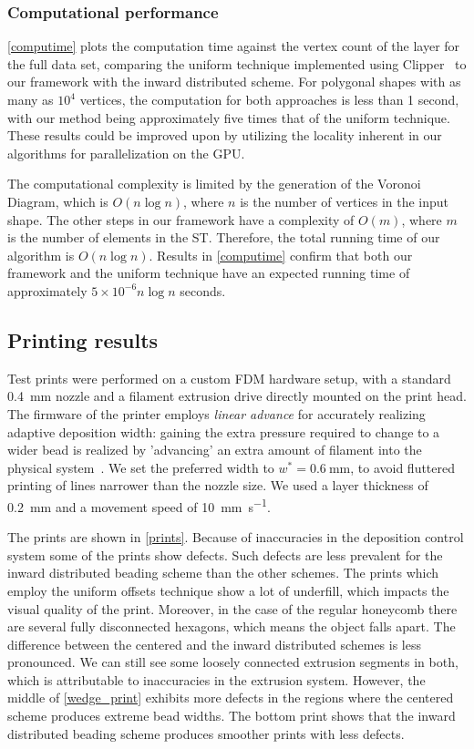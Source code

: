 \subsubsection{Computational performance}
\cref{computime} plots the computation time against the vertex count of the layer for the full data set, comparing the uniform technique implemented using Clipper~\cite{johnson2014clipper} to our framework with the inward distributed scheme.
For polygonal shapes with as many as $10^4$ vertices, the computation for both approaches is less than 1 second, with our method being approximately five times that of the uniform technique.
These results could be improved upon by utilizing the locality inherent in our algorithms for parallelization on the GPU.

The computational complexity is limited by the generation of the Voronoi Diagram, which is $O(n \log n)$, where $n$ is the number of vertices in the input shape.
The other steps in our framework have a complexity of $O(m)$, where $m$ is the number of elements in the ST.
Therefore, the total running time of our algorithm is $O(n \log n)$.
Results in \cref{computime} confirm that both our framework and the uniform technique have an expected running time of approximately $5 \times 10^{-6} n \log n$ seconds.






\subsection{Printing results}
Test prints were performed on a custom FDM hardware setup, with a standard \SI{0.4}{\milli\meter} nozzle and a filament extrusion drive directly mounted on the print head.
The firmware of the printer employs \emph{linear advance} for accurately realizing adaptive deposition width:
gaining the extra pressure required to change to a wider bead is realized by 'advancing' an extra amount of filament into the physical system~\cite{tronvoll2019investigating}.
We set the preferred width to $w^* = \SI{0.6}{\milli\meter}$, to avoid fluttered printing of lines narrower than the nozzle size.
We used a layer thickness of \SI{0.2}{\milli\meter} and a movement speed of \SI{10}{\milli\meter\per\second}.

The prints are shown in \cref{prints}.
Because of inaccuracies in the deposition control system some of the prints show defects.
Such defects are less prevalent for the inward distributed beading scheme than the other schemes.
The prints which employ the uniform offsets technique show a lot of underfill, which impacts the visual quality of the print.
Moreover, in the case of the regular honeycomb there are several fully disconnected hexagons, which means the object falls apart.
The difference between the centered and the inward distributed schemes is less pronounced.
We can still see some loosely connected extrusion segments in both, which is attributable to inaccuracies in the extrusion system.
However, the middle of \cref{wedge_print} exhibits more defects in the regions where the centered scheme produces extreme bead widths.
The bottom print shows that the inward distributed beading scheme produces smoother prints with less defects.


